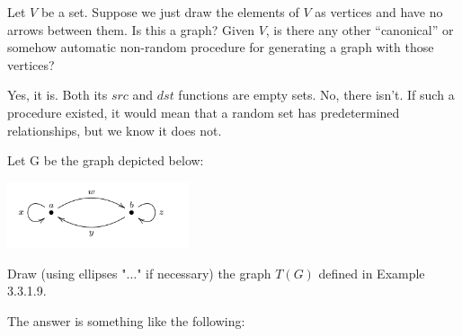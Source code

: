 \documentclass{article}
\begin{document}

\es Let $V$ be a set. Suppose we just draw the elements of $V$ as vertices and
    have no arrows between them. Is this a graph?
\ei Given $V$, is there any other “canonical” or somehow automatic non-random
    procedure for generating a graph with those vertices?
\ee

\ans

\es Yes, it is. Both its $src$ and $dst$ functions are empty sets.
\ei No, there isn't. If such a procedure existed, it would mean that a random
    set has predetermined relationships, but we know it does not.
\ee


Let G be the graph depicted below:

\begin{center}
\includegraphics[width=0.4\textwidth]{img/ex33110.png}
\end{center}

Draw (using ellipses "$\ldots$" if necessary) the graph $T(G)$ defined in Example
3.3.1.9.

\ans

The answer is something like the following:

\begin{center}
\end{center}
\end{document}

